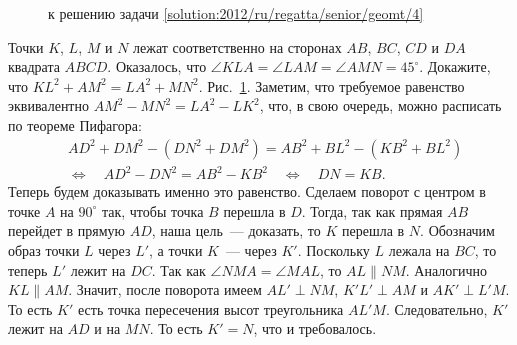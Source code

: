 \ifsolution
\begin{figure}\centering
    \caption{к решению задачи \ref{solution:2012/ru/regatta/senior/geomt/4}}
    \label{fig:solution:2012/ru/regatta/senior/geomt/4}
\end{figure}%
\fi %

\problem
Точки $K$, $L$, $M$ и $N$ лежат соответственно на сторонах
$AB$, $BC$, $CD$ и $DA$ квадрата $ABCD$.
Оказалось, что $\angle KLA = \angle LAM = \angle AMN = 45^\circ$.
Докажите, что $KL^2 + AM^2 = LA^2 + MN^2$.
\solution
\label{solution:2012/ru/regatta/senior/geomt/4}%
Рис.~\ref{fig:solution:2012/ru/regatta/senior/geomt/4}.
Заметим, что требуемое равенство эквивалентно
$AM^2 - MN^2 = LA^2 - LK^2$,
что, в свою очередь, можно расписать по теореме Пифагора:
\begin{align*}
&
    AD^2 + DM^2 - (DN^2 + DM^2) = AB^2 + BL^2 - (KB^2 + BL^2)
\\&\Leftrightarrow\quad
    AD^2 - DN^2 = AB^2 - KB^2
\quad\Leftrightarrow\quad
    DN = KB
.\end{align*}
Теперь будем доказывать именно это равенство.
Сделаем поворот с центром в точке $A$ на $90^\circ$ так, чтобы точка $B$
перешла в $D$.
Тогда, так как прямая $AB$ перейдет в прямую $AD$, наша цель~--- доказать, то
$K$ перешла в $N$.
Обозначим образ точки $L$ через $L'$, а точки $K$~--- через $K'$.
Поскольку $L$ лежала на $BC$, то теперь $L'$ лежит на $DC$.
Так как $\angle NMA = \angle MAL$, то $AL \parallel NM$.
Аналогично $KL \parallel AM$.
Значит, после поворота имеем
$AL' \perp NM$, $K'L' \perp AM$ и $AK' \perp L'M$.
То есть $K'$ есть точка пересечения высот треугольника $AL'M$.
Следовательно, $K'$ лежит на $AD$ и на $MN$.
То есть $K' = N$, что и требовалось.
\endproblem
